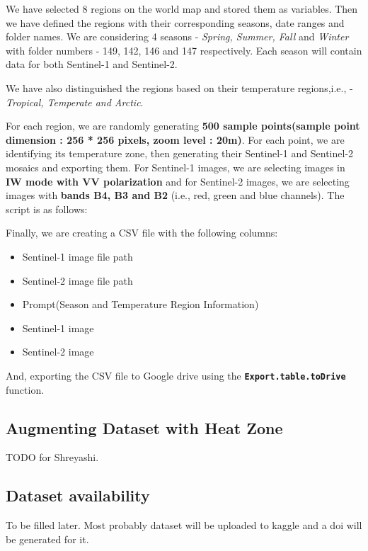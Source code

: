 We have selected 8 regions on the world map and stored them as variables. Then we have defined the regions with their corresponding seasons, date ranges and folder names. We are considering 4 seasons - \textit{Spring, Summer, Fall} and \textit{Winter} with folder numbers - 149, 142, 146 and 147 respectively. Each season will contain data for both Sentinel-1 and Sentinel-2.

We have also distinguished the regions based on their temperature regions,i.e., - \textit{Tropical, Temperate and Arctic}.

For each region, we are randomly generating \textbf{500 sample points(sample point dimension : 256 * 256 pixels, zoom level : 20m)}. For each point, we are identifying its temperature zone, then generating their Sentinel-1 and Sentinel-2 mosaics and exporting them. For Sentinel-1 images, we are selecting images in \textbf{IW mode with VV polarization} and for Sentinel-2 images, we are selecting images with \textbf{bands B4, B3 and B2} (i.e., red, green and blue channels). The script is as follows:

Finally, we are creating a CSV file with the following columns:
\begin{itemize}
    \item Sentinel-1 image file path
    \item Sentinel-2 image file path
    \item Prompt(Season and Temperature Region Information)
    \item Sentinel-1 image
    \item Sentinel-2 image
\end{itemize}
And, exporting the CSV file to Google drive using the \textbf{\texttt{Export.table.toDrive}} function.


\subsection{Augmenting Dataset with Heat Zone}
TODO for Shreyashi.

\subsection{Dataset availability}
To be filled later. Most probably dataset will be uploaded to kaggle and a doi will be generated for it.
